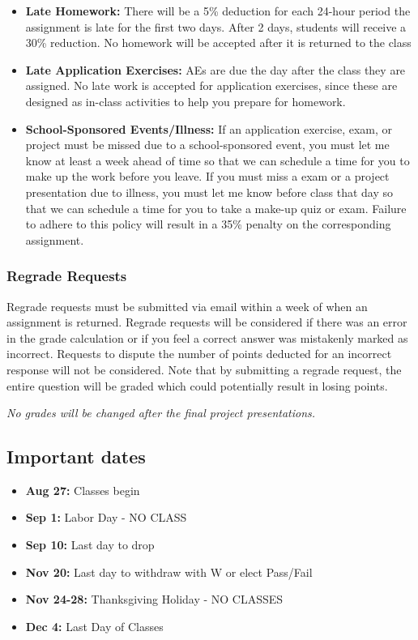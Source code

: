 \documentclass[
  letterpaper,
  DIV=11,
  numbers=noendperiod]{scrartcl}
\providecommand{\tightlist}{%
  \setlength{\itemsep}{0pt}\setlength{\parskip}{0pt}}
\begin{document}
\begin{itemize}
\item
  \textbf{Late Homework:} There will be a 5\% deduction for each 24-hour
  period the assignment is late for the first two days. After 2 days,
  students will receive a 30\% reduction. No homework will be accepted
  after it is returned to the class
\item
  \textbf{Late Application Exercises:} AEs are due the day after the
  class they are assigned. No late work is accepted for application
  exercises, since these are designed as in-class activities to help you
  prepare for homework.
\item
  \textbf{School-Sponsored Events/Illness:} If an application exercise,
  exam, or project must be missed due to a school-sponsored event, you
  must let me know at least a week ahead of time so that we can schedule
  a time for you to make up the work before you leave. If you must miss
  a exam or a project presentation due to illness, you must let me know
  before class that day so that we can schedule a time for you to take a
  make-up quiz or exam. Failure to adhere to this policy will result in
  a 35\% penalty on the corresponding assignment.
\end{itemize}

\subsubsection{Regrade Requests}\label{regrade-requests}

Regrade requests must be submitted via email within a week of when an
assignment is returned. Regrade requests will be considered if there was
an error in the grade calculation or if you feel a correct answer was
mistakenly marked as incorrect. Requests to dispute the number of points
deducted for an incorrect response will not be considered. Note that by
submitting a regrade request, the entire question will be graded which
could potentially result in losing points.

\emph{No grades will be changed after the final project presentations.}

\subsection{Important dates}\label{important-dates}

\begin{itemize}
\tightlist
\item
  \textbf{Aug 27:} Classes begin
\item
  \textbf{Sep 1:} Labor Day - NO CLASS
\item
  \textbf{Sep 10:} Last day to drop
\item
  \textbf{Nov 20:} Last day to withdraw with W or elect Pass/Fail
\item
  \textbf{Nov 24-28:} Thanksgiving Holiday - NO CLASSES
\item
  \textbf{Dec 4:} Last Day of Classes
\end{itemize}
\end{document}
